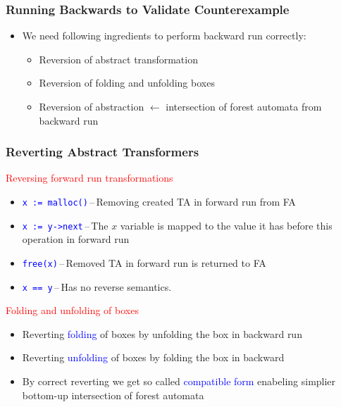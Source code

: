 \documentclass{beamer}
\newcommand{\hlbl}[1]{\textcolor{blue}{#1}}
\newcommand{\hlrd}[1]{\textcolor{red}{#1}}
\begin{document}
\begin{frame}
\frametitle{Running Backwards to Validate Counterexample}

	\begin{itemize}
		\item We need following ingredients to perform backward run correctly:
		\begin{itemize}
			\item Reversion of abstract transformation
			\item Reversion of folding and unfolding boxes
			\item Reversion of abstraction $\leftarrow$ intersection of forest automata
				from backward run
		\end{itemize}
	\end{itemize}

\end{frame}


\begin{frame}
\frametitle{Reverting Abstract Transformers}
	\hlrd{Reversing forward run transformations}
	\begin{itemize}
		\item \hlbl{\texttt{x := malloc()}}\,--\,Removing created TA in forward run from FA
		\item \hlbl{\texttt{x := y->next}}\,--\,The $x$ variable is mapped to the value it has
			before this operation in forward run
		\item \hlbl{\texttt{free(x)}}\,--\,Removed TA in forward run is returned to FA
		\item \hlbl{\texttt{x == y}}\,--\,Has no reverse semantics.
	\end{itemize}

	\hlrd{Folding and unfolding of boxes}
	\begin{itemize}
		\item Reverting \hlbl{folding} of boxes by unfolding the box
			in backward run
		\item Reverting \hlbl{unfolding} of boxes by folding the box
			in backward
		\item By correct reverting we get so called \hlbl{compatible form}
			enabeling simplier bottom-up intersection of forest automata
	\end{itemize}

\end{frame}
\end{document}
